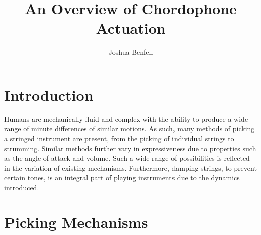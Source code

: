 \documentclass[12pt, a4paper, onecolumn]{IEEEtran}
\title{An Overview of Chordophone Actuation}
\author{Joshua Benfell}
\begin{document}
	\maketitle
    \section{Introduction}
        Humans are mechanically fluid and complex with the ability to produce a wide range of minute differences of similar motions. 
        As such, many methods of picking a stringed instrument are present, from the picking of individual strings to strumming. 
        Similar methods further vary in expressiveness due to properties such as the angle of attack and volume.
        Such a wide range of possibilities is reflected in the variation of existing mechanisms.
        Furthermore, damping strings, to prevent certain tones, is an integral part of playing instruments due to the dynamics introduced.
    \section{Picking Mechanisms}
\end{document}
